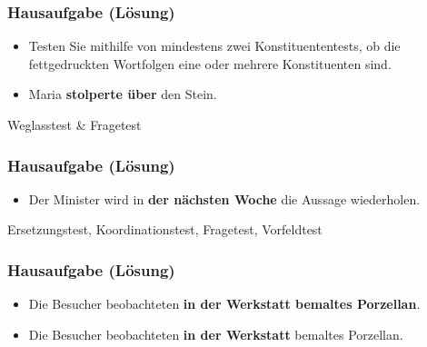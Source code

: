 {
	

\begin{frame}
\frametitle{Hausaufgabe (Lösung)}


\begin{itemize}
	\item Testen Sie mithilfe von mindestens zwei Konstituententests, ob die fettgedruckten Wortfolgen eine oder mehrere Konstituenten sind.

\vspace{.5cm}
	
	\item[] Maria \textbf{stolperte über} den Stein.
\end{itemize}

\pause 

\ea Weglasstest \& Fragetest \ras {}
	\z 
\z

\end{frame}


\begin{frame}
\frametitle{Hausaufgabe (Lösung)}

\begin{itemize}
	\item[] Der Minister wird in \textbf{der nächsten Woche} die Aussage wiederholen.
\end{itemize}

\pause 

\ea Ersetzungstest, Koordinationstest, Fragetest, Vorfeldtest \ras {}

	\z 
\z

\end{frame}


\begin{frame}
\frametitle{Hausaufgabe (Lösung)}

\begin{itemize}
	\item[] Die Besucher beobachteten \textbf{in der Werkstatt bemaltes Porzellan}.
	
	\item[] Die Besucher beobachteten \textbf{in der Werkstatt} bemaltes Porzellan.
\end{itemize}


\end{frame}}
